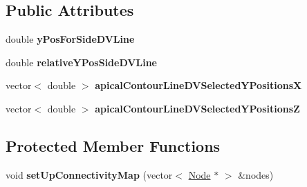 \subsection*{Public Attributes}
\begin{DoxyCompactItemize}
\item 
\hypertarget{classAnalysis_a4e9a92fdedfbfdafeb9a8d689c41bb96}{}double {\bfseries y\+Pos\+For\+Side\+D\+V\+Line}\label{classAnalysis_a4e9a92fdedfbfdafeb9a8d689c41bb96}

\item 
\hypertarget{classAnalysis_ad8cb4c16c741709c37f2c034ff535dca}{}double {\bfseries relative\+Y\+Pos\+Side\+D\+V\+Line}\label{classAnalysis_ad8cb4c16c741709c37f2c034ff535dca}

\item 
\hypertarget{classAnalysis_a837cccf723fd42fb0f16488c649f720e}{}vector$<$ double $>$ {\bfseries apical\+Contour\+Line\+D\+V\+Selected\+Y\+Positions\+X}\label{classAnalysis_a837cccf723fd42fb0f16488c649f720e}

\item 
\hypertarget{classAnalysis_ae5d3891764edbeea42889c407d3c28b4}{}vector$<$ double $>$ {\bfseries apical\+Contour\+Line\+D\+V\+Selected\+Y\+Positions\+Z}\label{classAnalysis_ae5d3891764edbeea42889c407d3c28b4}

\end{DoxyCompactItemize}
\subsection*{Protected Member Functions}
\begin{DoxyCompactItemize}
\item 
\hypertarget{classAnalysis_a273cdcac178e25714b0adf8aa7d70715}{}void {\bfseries set\+Up\+Connectivity\+Map} (vector$<$ \hyperlink{classNode}{Node} $\ast$ $>$ \&nodes)\label{classAnalysis_a273cdcac178e25714b0adf8aa7d70715}

\end{DoxyCompactItemize}
